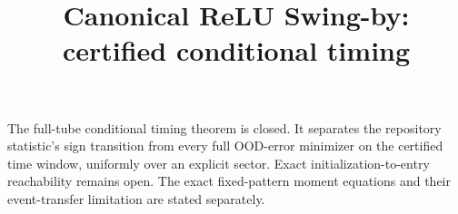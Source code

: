 \documentclass[10pt]{article}
\title{Canonical ReLU Swing-by: certified conditional timing}
\author{}\date{}
\begin{document}
\maketitle
\noindent
The full-tube conditional timing theorem is closed. It separates the
repository statistic's sign transition from every full OOD-error minimizer
on the certified time window, uniformly over an explicit sector. Exact
initialization-to-entry reachability remains open. The exact fixed-pattern
moment equations and their event-transfer limitation are stated separately.


\end{document}
